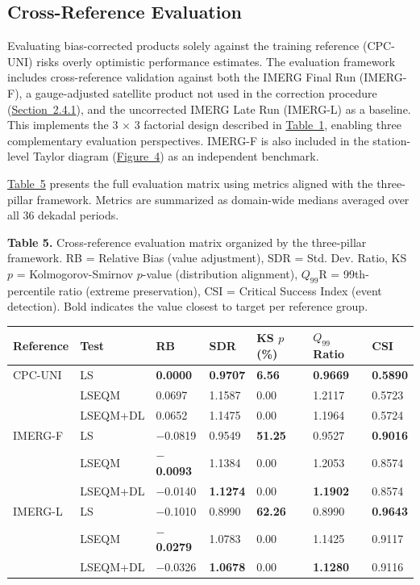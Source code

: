 \documentclass[11pt,a4paper]{article}
\begin{document}
\subsection{Cross-Reference
Evaluation}\label{cross-reference-evaluation}

Evaluating bias-corrected products solely against the training reference
(CPC-UNI) risks overly optimistic performance estimates. The evaluation
framework includes cross-reference validation against both the IMERG
Final Run (IMERG-F), a gauge-adjusted satellite product not used in the
correction procedure (\hyperref[nine-combination-evaluation-design]{Section~2.4.1}), and the uncorrected IMERG Late Run
(IMERG-L) as a baseline. This implements the 3 \(\times\) 3 factorial
design described in \hyperref[tab:1]{Table~1}, enabling three complementary evaluation
perspectives. IMERG-F is also included in the station-level Taylor
diagram (\hyperref[fig4]{Figure~4}) as an independent benchmark.

\hyperref[tab:5]{Table~5} presents the full evaluation matrix using metrics aligned with
the three-pillar framework. Metrics are summarized as domain-wide
medians averaged over all 36 dekadal periods.

\label{tab:5}
\textbf{Table 5.} Cross-reference evaluation matrix organized by the
three-pillar framework. RB = Relative Bias (value adjustment), SDR =
Std. Dev. Ratio, KS \(p\) = Kolmogorov-Smirnov \(p\)-value (distribution
alignment), \(Q_{99}\)R = 99th-percentile ratio (extreme preservation),
CSI = Critical Success Index (event detection). Bold indicates the value
closest to target per reference group.

\begingroup\small
\begin{longtable}[]{@{}lllllll@{}}
\toprule
Reference & Test & RB & SDR & KS \(p\) (\%) & \(Q_{99}\) Ratio & CSI \\
\midrule
\endhead
\bottomrule
\endlastfoot
CPC-UNI & LS & \textbf{0.0000} & \textbf{0.9707} & \textbf{6.56} &
\textbf{0.9669} & \textbf{0.5890} \\
& LSEQM & 0.0697 & 1.1587 & 0.00 & 1.2117 & 0.5723 \\
& LSEQM+DL & 0.0652 & 1.1475 & 0.00 & 1.1964 & 0.5724 \\
IMERG-F & LS & $-$0.0819 & 0.9549 & \textbf{51.25} & 0.9527 & \textbf{0.9016} \\
& LSEQM & \textbf{$-$0.0093} & 1.1384 & 0.00 & 1.2053 & 0.8574 \\
& LSEQM+DL & $-$0.0140 & \textbf{1.1274} & 0.00 & \textbf{1.1902} & 0.8574 \\
IMERG-L & LS & $-$0.1010 & 0.8990 & \textbf{62.26} & 0.8990 & \textbf{0.9643} \\
& LSEQM & \textbf{$-$0.0279} & 1.0783 & 0.00 & 1.1425 & 0.9117 \\
& LSEQM+DL & $-$0.0326 & \textbf{1.0678} & 0.00 & \textbf{1.1280} & 0.9116 \\
\end{longtable}
\endgroup
\end{document}
